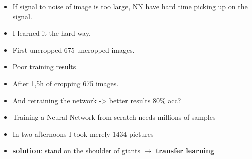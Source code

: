 \documentclass{beamer}
\begin{document}
\begin{frame}
\begin{itemize}
 \item If signal to noise of image is too large, NN have hard time picking up on the signal.
 \item I learned it the hard way.
 \item First uncropped 675 uncropped images.
 \item Poor training results 
 \item After 1,5h of cropping 675 images.
 \item And retraining the network -> better results 80\% acc?
\end{itemize}
\end{frame}


\begin{frame}
\begin{itemize}
 \item Training a Neural Network from scratch needs millions of samples 
 \item In two afternoons I took merely 1434 pictures
 \item \textbf{solution}: stand on the shoulder of giants $\rightarrow$ \textbf{transfer learning}
\end{itemize}
\end{frame}
\end{document}
